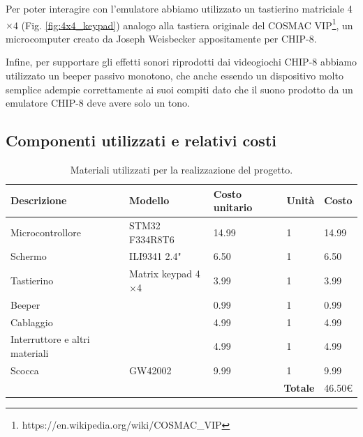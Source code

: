 \documentclass[a4paper]{article}
\begin{document}
Per poter interagire con l'emulatore abbiamo utilizzato un tastierino matriciale 4$\times$4
(Fig. \ref{fig:4x4_keypad}) analogo alla tastiera originale del
COSMAC VIP\footnote{https://en.wikipedia.org/wiki/COSMAC\_VIP}, un microcomputer
creato da Joseph Weisbecker appositamente per CHIP-8.

Infine, per supportare gli effetti sonori riprodotti dai videogiochi CHIP-8 abbiamo
utilizzato un beeper passivo monotono, che anche essendo un dispositivo molto semplice
adempie correttamente ai suoi compiti dato che il suono prodotto da un emulatore CHIP-8
deve avere solo un tono.

\subsection{Componenti utilizzati e relativi costi}

\begin{table}[h!t] %
    \centering
    \begin{tabular}{|llll|l|}
        \hline
        \multicolumn{1}{|l|}{\textbf{Descrizione}}          & \multicolumn{1}{l|}{\textbf{Modello}}       & \multicolumn{1}{l|}{\textbf{Costo unitario}} & \textbf{Unità} & \textbf{Costo} \\ \hline
        \multicolumn{1}{|l|}{Microcontrollore}       & \multicolumn{1}{l|}{STM32 F334R8T6}         & \multicolumn{1}{l|}{14.99}                   & 1               & 14.99          \\ \hline
        \multicolumn{1}{|l|}{Schermo}                & \multicolumn{1}{l|}{ILI9341 2.4"}           & \multicolumn{1}{l|}{6.50}                    & 1               & 6.50           \\ \hline
        \multicolumn{1}{|l|}{Tastierino}          & \multicolumn{1}{l|}{Matrix keypad 4$\times$4} & \multicolumn{1}{l|}{3.99}                    & 1               & 3.99           \\ \hline
        \multicolumn{1}{|l|}{Beeper}                 & \multicolumn{1}{l|}{}                       & \multicolumn{1}{l|}{0.99}                    & 1               & 0.99           \\ \hline
        \multicolumn{1}{|l|}{Cablaggio} & \multicolumn{1}{l|}{}                       & \multicolumn{1}{l|}{4.99}                    & 1               & 4.99           \\ \hline
        \multicolumn{1}{|l|}{Interruttore e altri materiali} & \multicolumn{1}{l|}{}       & \multicolumn{1}{l|}{4.99}                    & 1               & 4.99           \\ \hline
        \multicolumn{1}{|l|}{Scocca} & \multicolumn{1}{l|}{GW42002}                       & \multicolumn{1}{l|}{9.99}                    & 1               & 9.99           \\ \hline
        \multicolumn{4}{|r|}{\textbf{Totale}}                                                      & 46.50\euro    \\ \hline
    \end{tabular}
    \caption{
        Materiali utilizzati per la realizzazione del progetto.
    }
    \label{tab:components}
\end{table}
\end{document}

